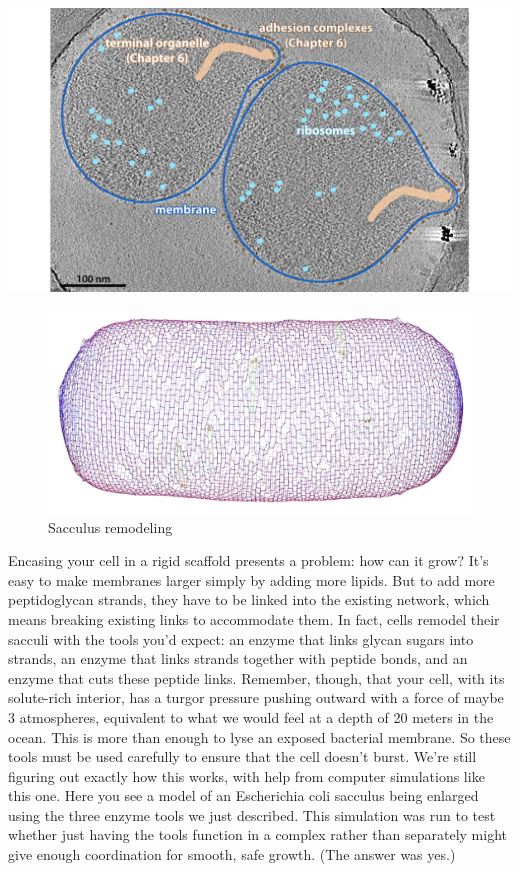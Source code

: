 \documentclass[]{tufte-book}
\begin{document}
\includegraphics{img/02_static/2_1_Mgenitalium}

\begin{figure}
\includegraphics{img/02_schematic/2_3_2_SacculusRemodeling} \caption[Sacculus remodeling]{Sacculus remodeling}\label{fig:2-3-2}
\end{figure}

Encasing your cell in a rigid scaffold presents a problem: how can it
grow? It's easy to make membranes larger simply by adding more lipids.
But to add more peptidoglycan strands, they have to be linked into the
existing network, which means breaking existing links to accommodate
them. In fact, cells remodel their sacculi with the tools you'd expect:
an enzyme that links glycan sugars into strands, an enzyme that links
strands together with peptide bonds, and an enzyme that cuts these
peptide links. Remember, though, that your cell, with its solute-rich
interior, has a turgor pressure pushing outward with a force of maybe 3
atmospheres, equivalent to what we would feel at a depth of 20 meters in
the ocean. This is more than enough to lyse an exposed bacterial
membrane. So these tools must be used carefully to ensure that the cell
doesn't burst. We're still figuring out exactly how this works, with
help from computer simulations like this one. Here you see a model of an
Escherichia coli sacculus being enlarged using the three enzyme tools we
just described. This simulation was run to test whether just having the
tools function in a complex rather than separately might give enough
coordination for smooth, safe growth. (The answer was yes.)
\end{document}
